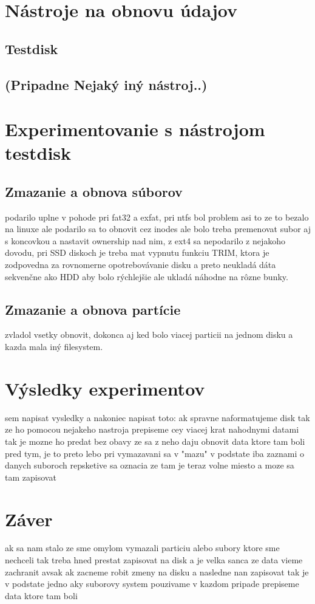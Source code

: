 \documentclass[12pt,oneside,slovak,a4paper]{article}
\begin{document}

\section{Nástroje na obnovu údajov}


\subsection{Testdisk}


\subsection{(Pripadne Nejaký iný nástroj..)}


\section{Experimentovanie s nástrojom testdisk}


\subsection{Zmazanie a obnova súborov}
podarilo uplne v pohode pri fat32 a exfat, pri ntfs bol problem asi to ze to bezalo na linuxe ale podarilo sa to obnovit cez inodes ale bolo treba premenovat subor aj s koncovkou a nastavit ownership nad nim, z ext4 sa nepodarilo z nejakoho dovodu, pri SSD diskoch je treba mat vypnutu funkciu TRIM, ktora je zodpovedna za rovnomerne opotrebovávanie disku a preto neukladá dáta sekvenčne ako HDD aby bolo rýchlejšie ale ukladá náhodne na rôzne bunky.


\subsection{Zmazanie a obnova partície}
zvladol vsetky obnovit, dokonca aj ked bolo viacej particii na jednom disku a kazda mala iný filesystem.

\section{Výsledky experimentov}
sem napisat vysledky a nakoniec napisat toto: ak spravne naformatujeme disk tak ze ho pomocou nejakeho nastroja prepiseme cey viacej krat nahodnymi datami tak je mozne ho predat bez obavy ze sa z neho daju obnovit data ktore tam boli pred tym, je to preto lebo pri vymazavani sa v "mazu" v podstate iba zaznami o danych suboroch repsketive sa oznacia ze tam je teraz volne miesto a moze sa tam zapisovat

\section{Záver}
ak sa nam stalo ze sme omylom vymazali particiu alebo subory ktore sme nechceli tak treba hned prestat zapisovat na disk a je velka sanca ze data vieme zachranit avsak ak zacneme robit zmeny na disku a nasledne nan zapisovat tak je v podstate jedno aky suborovy system pouzivame v kazdom pripade prepiseme data ktore tam boli




\end{document}
